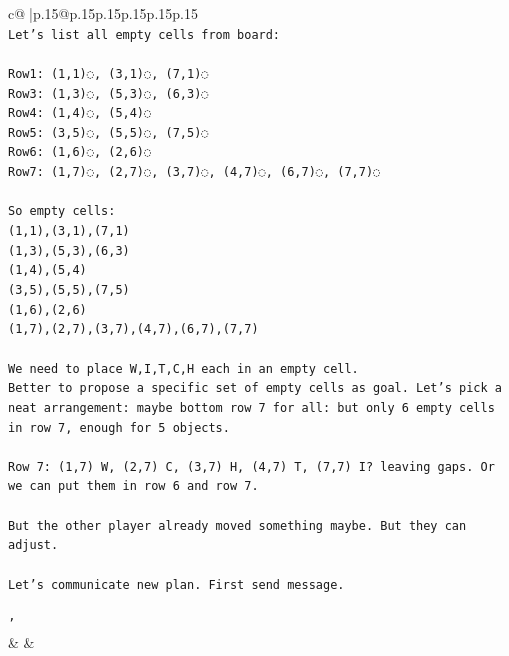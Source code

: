 \documentclass{article}
\begin{document}
{\begin{supertabular}{c@{$\;$}|p{.15\linewidth}@{}p{.15\linewidth}p{.15\linewidth}p{.15\linewidth}p{.15\linewidth}p{.15\linewidth}}
{{{\\ 
\texttt{Let’s list all empty cells from board:} \\
\\ 
\texttt{Row1: (1,1)◌, (3,1)◌, (7,1)◌  } \\
\texttt{Row3: (1,3)◌, (5,3)◌, (6,3)◌  } \\
\texttt{Row4: (1,4)◌, (5,4)◌  } \\
\texttt{Row5: (3,5)◌, (5,5)◌, (7,5)◌  } \\
\texttt{Row6: (1,6)◌, (2,6)◌  } \\
\texttt{Row7: (1,7)◌, (2,7)◌, (3,7)◌, (4,7)◌, (6,7)◌, (7,7)◌  } \\
\\ 
\texttt{So empty cells:  } \\
\texttt{(1,1),(3,1),(7,1)  } \\
\texttt{(1,3),(5,3),(6,3)  } \\
\texttt{(1,4),(5,4)  } \\
\texttt{(3,5),(5,5),(7,5)  } \\
\texttt{(1,6),(2,6)  } \\
\texttt{(1,7),(2,7),(3,7),(4,7),(6,7),(7,7)} \\
\\ 
\texttt{We need to place W,I,T,C,H each in an empty cell.  } \\
\texttt{Better to propose a specific set of empty cells as goal. Let's pick a neat arrangement: maybe bottom row 7 for all: but only 6 empty cells in row 7, enough for 5 objects.} \\
\\ 
\texttt{Row 7: (1,7) W, (2,7) C, (3,7) H, (4,7) T, (7,7) I? leaving gaps. Or we can put them in row 6 and row 7.} \\
\\ 
\texttt{But the other player already moved something maybe. But they can adjust.} \\
\\ 
\texttt{Let’s communicate new plan. First send message.} \\
\\ 
\texttt{'} \\
            }
        }
    }
    & & \\ \\


\end{supertabular}}
\end{document}
